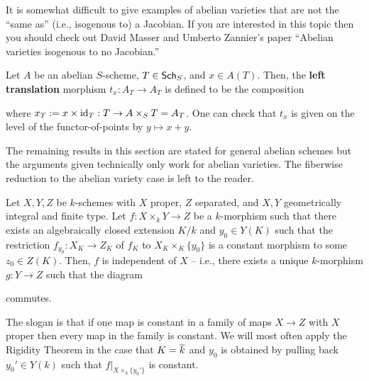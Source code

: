 \documentclass[11pt]{article}
\begin{document}
\begin{remark}
It is somewhat difficult to give examples of abelian varieties that are not the ``same as'' (i.e., isogenous to) a Jacobian. If you are interested in this topic then you should check out David Masser and Umberto Zannier's paper ``Abelian varieties isogenous to no Jacobian.''
\end{remark}

\begin{definition}
Let $A$ be an abelian $S$-scheme, $T\in\operatorname{\mathsf{Sch}}_S$, and $x\in A(T)$. Then, the \textbf{left translation} morphism $t_x: A_T\to A_T$ is defined to be the composition 
\begin{center}
\end{center}
where $x_T:=x\times\operatorname{id}_T: T\to A\times_ST=A_T$. One can check that $t_x$ is given on the level of the functor-of-points by $y\mapsto x+y$.
\end{definition}

The remaining results in this section are stated for general abelian schemes but the arguments given technically only work for abelian varieties. The fiberwise reduction to the abelian variety case is left to the reader.

\begin{theorem}[Rigidity]\label{Rigidity_Thm}
Let $X,Y,Z$ be $k$-schemes with $X$ proper, $Z$ separated, and $X,Y$ geometrically integral and finite type. Let $f: X\times_kY\to Z$ be a $k$-morphism such that there exists an algebraically closed extension $K/k$ and $y_0\in Y(K)$ such that the restriction $f_{y_0}: X_K\to Z_K$ of $f_K$ to $X_K\times_K\{y_0\}$ is a constant morphism to some $z_0\in Z(K)$. Then, $f$ is independent of $X$ -- i.e., there exists a unique $k$-morphism $g: Y\to Z$ such that the diagram
\begin{center}
\end{center}
commutes.
\end{theorem}

The slogan is that if one map is constant in a family of maps $X\to Z$ with $X$ proper then every map in the family is constant. We will most often apply the Rigidity Theorem in the case that $K=\overline{k}$ and $y_0$ is obtained by pulling back $y_0'\in Y(k)$ such that $f|_{X\times_k\{y_0'\}}$ is constant.
\end{document}
